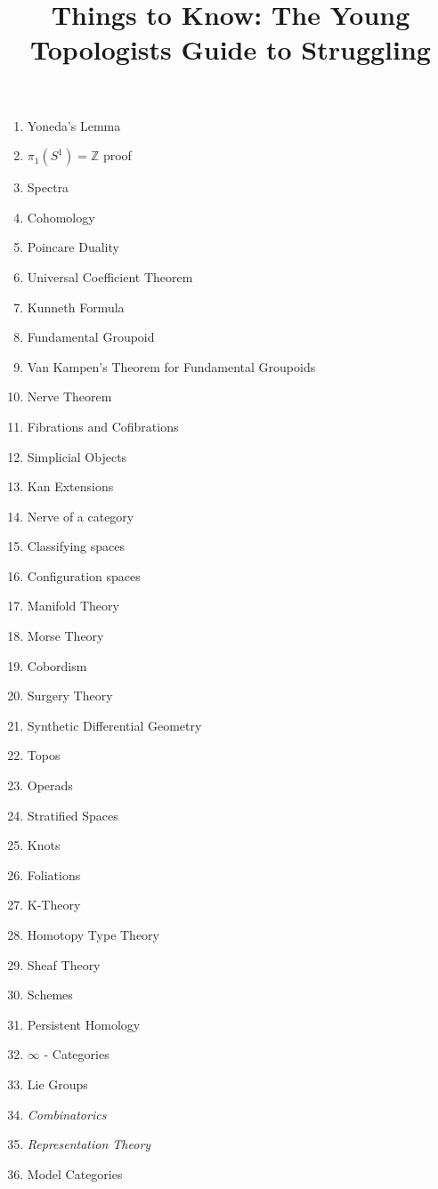\documentclass[11pt]{article}
\title{Things to Know: The Young Topologists Guide to Struggling}
\theoremstyle{definition}
\theoremstyle{definition}
\begin{document}
\begin{enumerate}
\item Yoneda's Lemma
\item $\pi_1(S^1) = \mathbb{Z}$ proof
\item Spectra
\item Cohomology
\item Poincare Duality
\item Universal Coefficient Theorem
\item Kunneth Formula
\item Fundamental Groupoid
\item Van Kampen's Theorem for Fundamental Groupoids
\item Nerve Theorem
\item Fibrations and Cofibrations
\item Simplicial Objects
\item Kan Extensions
\item Nerve of a category
\item Classifying spaces
\item Configuration spaces
\item Manifold Theory
\item Morse Theory
\item Cobordism
\item Surgery Theory
\item Synthetic Differential Geometry
\item Topos
\item Operads
\item Stratified Spaces
\item Knots
\item Foliations
\item K-Theory
\item Homotopy Type Theory
\item Sheaf Theory
\item Schemes
\item Persistent Homology
\item $\infty$ - Categories
\item Lie Groups
\item \textit{Combinatorics} 
\item \textit{Representation Theory}
\item Model Categories
\end{enumerate}
\end{document}
